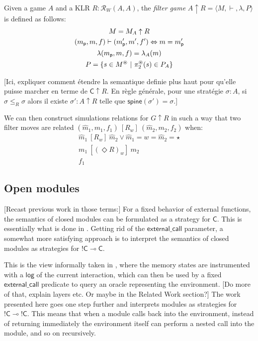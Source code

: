 \documentclass[acmsmall,anonymous]{acmart}
\newcommand{\kw}[1]{\ensuremath{ \textsf{#1} }}
\newcommand{\ifr}[1]{\ [{#1}]\ }
\newcommand{\EC}{\kw{C}}
\begin{document}
\begin{definition}
Given a game $A$ and a KLR $R : \mathcal{R}_W(A, A)$,
the \emph{filter game} $A \uparrow R = \langle M, \vdash, \lambda, P \rangle$
is defined as follows:
\begin{gather*}
  M = M_A \uparrow R \\
  (m_\kw{p}, m, f) \vdash (m_\kw{p}', m', f') \Leftrightarrow m = m_\kw{p}' \\
  \lambda(m_\kw{p}, m, f) = \lambda_A(m) \\
  P = \{ s \in M^\oast \ |\ \pi_2^\oast(s) \in P_A \}
\end{gather*}
\end{definition}

[Ici,
expliquer comment \'etendre la semantique definie plus haut
pour qu'elle puisse marcher en terme de $\EC \uparrow R$.
En r\`egle g\'en\'erale, pour
une strat\'egie $\sigma : A$,
si $\sigma \le_R \sigma$
alors il existe $\sigma' : A \uparrow R$
telle que $\kw{spine}(\sigma') = \sigma$.]

We can then construct simulations relations for $G \uparrow R$
in such a way that two filter moves are related
$(\hat{m}_1, m_1, f_1) \ifr{R_w} (\hat{m}_2, m_2, f_2)$ when:
\begin{gather*}
  \hat{m}_1 \ifr{R_w} \hat{m}_2 \vee \hat{m}_1 = w = \hat{m}_2 = \star\\
  m_1 \ifr{(\Diamond R)_w} m_2 \\
  f_1
\end{gather*}


\subsection{Open modules} %

[Recast previous work in those terms:]
For a fixed behavior of external functions,
the semantics of closed modules can be
formulated as a strategy for $\EC$.
This is essentially what is done in \citep{popl15}.
Getting rid of the $\kw{external\_call}$ parameter,
a somewhat more satisfying approach is
to interpret the semantics of closed modules
as strategies for
$!\EC \multimap \EC$.

This is the view informally taken in \citep{osdi16},
where the memory states are instrumented with a \kw{log}
of the current interaction,
which can then be used by
a fixed $\kw{external\_call}$ predicate
to query an oracle representing the environment.
[Do more of that, explain layers etc.
Or maybe in the Related Work section?]
The work presented here goes one step further
and interprets modules as strategies for $!\EC \multimap !\EC$.
This means that
when a module calls back into the environment,
instead of returning immediately
the environment itself
can perform a nested call into the module,
and so on recursively.
\end{document}
